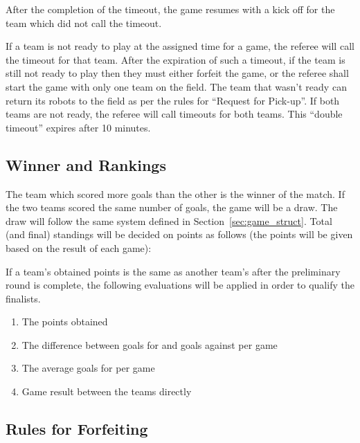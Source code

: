 \documentclass[12pt]{article}
\begin{document}
After the completion of the timeout, the game resumes with a kick off for the team which did not call the timeout.

If a team is not ready to play at the assigned time for a game, the referee will call the timeout for that team. After the expiration of such a timeout, if the team is still not ready to play then they must either forfeit the game, or the referee shall start the game with only one team on the field.  The team that wasn't ready can return its robots to the field as per the rules for ``Request for Pick-up''. If both teams are not ready, the referee will call timeouts for both teams. This ``double timeout'' expires after 10 minutes.

\subsection{Winner and Rankings}

The team which scored more goals than the other is the winner of the match. If the two teams scored the same number of goals, the game will be a draw. The draw will follow the same system defined in Section~\ref{sec:game_struct}. Total (and final) standings will be decided on points as follows (the points will be given based on the result of each game):


If a team's obtained points is the same as another team's after the preliminary round is complete, the following evaluations will be applied in order to qualify the finalists.

\begin{enumerate}

\item The points obtained

\item The
 difference between goals for and goals against per game

\item The average goals for per game

\item Game result between the teams directly

\end{enumerate}

\subsection{Rules for Forfeiting}
\label{sec:forfeit}
\end{document}
